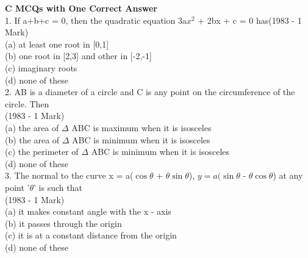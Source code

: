 \documentclass[journal,12pt,twocolumn]{IEEEtran}
\theoremstyle{remark}
\begin{document}
\indent\hspace{0.3cm}\textbf{C MCQs with One Correct Answer}\\[6pt]
1.  If a+b+c = 0, then the quadratic equation 3a$x^2$ \indent + 2bx + c = 0 has\hspace{2.2cm}(1983 - 1 Mark)\\[2pt]\indent (a)\hspace{0.2cm} at least one root in [0,1]\\[2pt]\indent (b)\hspace{0.2cm} one root in [2,3] and other in [-2,-1]\\[2pt]\indent (c)\hspace{0.2cm} imaginary roots\\[2pt]\indent (d)\hspace{0.2cm} none of these\\[3pt]
2.  AB is a diameter of a circle and C is any point \indent on the circumference of the circle. Then\\[2pt]\indent\hspace{5.4cm} (1983 - 1 Mark)\\[2pt]\indent (a)\hspace{0.2cm} the area of $\Delta$ ABC is maximum when it is \indent \indent \indent isosceles\\[2pt]\indent (b)\hspace{0.2cm} the area of $\Delta$ ABC is minimum when it is \indent \indent \indent isosceles\\[2pt]\indent (c)\hspace{0.2cm} the perimeter of $\Delta$ ABC is minimum when \indent \indent \indent it is isosceles\\[2pt]\indent (d)\hspace{0.2cm} none of these\\[3pt]
3.  The normal to the curve x = a($\cos \theta$ + $\theta\sin \theta$), \indent $y = a(\sin \theta$ - $\theta\cos \theta$) at any point '$\theta$' is such that\\[2pt]\indent\hspace{5.4cm}(1983 - 1 Mark)\\[2pt]\indent (a)\hspace{0.2cm} it makes  constant angle with the x - axis\\[2pt]\indent (b)\hspace{0,2cm} it passes through the origin\\[2pt]\indent (c)\hspace{0.2cm} it is at a constant distance from the origin\\[2pt]\indent (d)\hspace{0.2cm} none of these\\[3pt]
\end{document}
